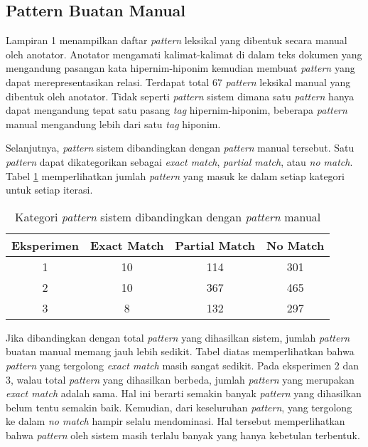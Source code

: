 \subsection{Pattern Buatan Manual}
Lampiran 1 menampilkan daftar \textit{pattern} leksikal yang dibentuk secara manual oleh anotator. Anotator mengamati kalimat-kalimat di dalam teks dokumen yang mengandung pasangan kata hipernim-hiponim kemudian membuat \textit{pattern} yang dapat merepresentasikan relasi. Terdapat total 67 \textit{pattern} leksikal manual yang dibentuk oleh anotator. Tidak seperti \textit{pattern} sistem dimana satu \textit{pattern} hanya dapat mengandung tepat satu pasang \textit{tag} hipernim-hiponim, beberapa \textit{pattern} manual mengandung lebih dari satu \textit{tag} hiponim.

Selanjutnya, \textit{pattern} sistem dibandingkan dengan \textit{pattern} manual tersebut. Satu \textit{pattern} dapat dikategorikan sebagai \textit{exact match}, \textit{partial match}, atau \textit{no match}. Tabel \ref{table:psis-kategori} memperlihatkan jumlah \textit{pattern} yang masuk ke dalam setiap kategori untuk setiap iterasi.

\begin{table}
  \centering
  \caption{Kategori \textit{pattern} sistem dibandingkan dengan \textit{pattern} manual}
  \label{table:psis-kategori}
  \begin{tabular}{|c|c|c|c|}
  \hline
  Eksperimen & Exact Match & Partial Match & No Match \\ \hline
  1 & 10 & 114 & 301 \\ \hline
  2 & 10 & 367 & 465 \\ \hline
  3 & 8 & 132 & 297 \\ \hline 
  \end{tabular} 
\end{table}

Jika dibandingkan dengan total \textit{pattern} yang dihasilkan sistem, jumlah \textit{pattern} buatan manual memang jauh lebih sedikit. Tabel diatas memperlihatkan bahwa \textit{pattern} yang tergolong \textit{exact match} masih sangat sedikit. Pada eksperimen 2 dan 3, walau total \textit{pattern} yang dihasilkan berbeda, jumlah \textit{pattern} yang merupakan \textit{exact match} adalah sama. Hal ini berarti semakin banyak \textit{pattern} yang dihasilkan belum tentu semakin baik. Kemudian, dari keseluruhan \textit{pattern}, yang tergolong ke dalam \textit{no match} hampir selalu mendominasi. Hal tersebut memperlihatkan bahwa  \textit{pattern} oleh sistem masih terlalu banyak yang hanya kebetulan terbentuk.

